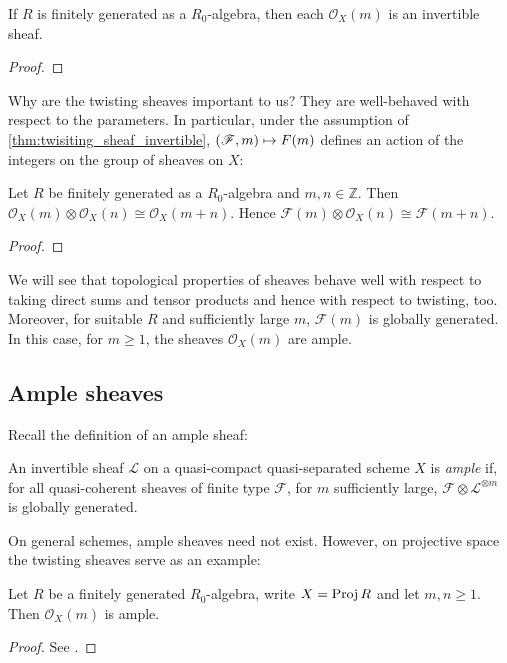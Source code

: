 \documentclass[12pt]{ociamthesis}  %
\begin{document}
\begin{proposition}
  \label{thm:twisiting_sheaf_invertible}
  If $R$ is finitely generated as a $R_0$-algebra, then each
  $\mathscr O_X(m)$ is an invertible sheaf.
  \begin{proof}
    \missingproof
  \end{proof}
\end{proposition}

Why are the twisting sheaves important to us? They are well-behaved
with respect to the parameters. In particular,
under the assumption of \ref{thm:twisiting_sheaf_invertible},
$(\mathscr F,m)\mapsto \mathscr \mathscr F(m)$ defines an action of
the integers on the group of sheaves on $X$:

\begin{lemma}\label{lem:additivity_twisting_sheaf}
  Let $R$ be finitely generated as a $R_0$-algebra and $m,n\in\mathbb{Z}$.
  Then $\mathscr O_X(m) \otimes \mathscr O_X(n) \cong \mathscr O_X(m + n)$. Hence
  $\mathscr F(m) \otimes \mathscr O_X(n) \cong \mathscr F(m+n)$.
  \begin{proof}
    \missingproof
  \end{proof}
\end{lemma}

We will see that topological properties of sheaves behave well
with respect to taking direct sums and tensor products and hence
with respect to twisting, too. Moreover, for suitable $R$ and
sufficiently large $m$, $\mathscr F(m)$ is globally generated. In this
case, for $m\geq 1$, the sheaves $\mathscr O_X(m)$ are ample.

\subsection{Ample sheaves}

Recall the definition of an ample sheaf:

\begin{definition}
  An invertible sheaf $\mathscr L$ on a quasi-compact quasi-separated
  scheme $X$ is \emph{ample} if, for all quasi-coherent sheaves of
  finite type $\mathscr F$, for $m$ sufficiently large,
  $\mathscr F\otimes \mathscr L^{\otimes m}$ is
  globally generated.
\end{definition}

On general schemes, ample sheaves need not exist. However, on
projective space the twisting sheaves serve as an example:

\begin{proposition}
  Let $R$ be a finitely generated $R_0$-algebra,
  write $X=\operatorname{Proj} R$ and let $m,n\geq 1$. Then
  $\mathscr O_X(m)$ is ample.
  \begin{proof}
    See \cite[Example 13.45]{gortz2010}.
  \end{proof}
\end{proposition}
\end{document}
